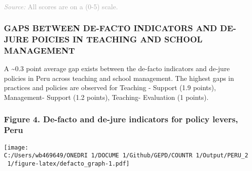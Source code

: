 \documentclass[twocolumn]{article}
\begin{document}
\begin{table}[H]
\\
{\scriptsize
    \textcolor{darkgray}{\textit{Source:} All scores are on a (0-5) scale.}
  }

\end{table}
\raggedbottom

\hypertarget{gaps-between-de-facto-indicators-and-de-jure-poicies-in-teaching-and-school-management}{%
\subsubsection{\texorpdfstring{\textbf{GAPS BETWEEN DE-FACTO INDICATORS
AND DE-JURE POICIES IN TEACHING AND SCHOOL
MANAGEMENT}}{GAPS BETWEEN DE-FACTO INDICATORS AND DE-JURE POICIES IN TEACHING AND SCHOOL MANAGEMENT}}\label{gaps-between-de-facto-indicators-and-de-jure-poicies-in-teaching-and-school-management}}

A \textasciitilde{}0.3 point average gap exists between the de-facto
indicators and de-jure policies in Peru across teaching and school
management. The highest gaps in practices and policies are observed for
Teaching - Support (1.9 points), Management- Support (1.2 points),
Teaching- Evaluation (1 points).

\hypertarget{figure-4.-de-facto-and-de-jure-indicators-for-policy-levers-peru}{%
\subsubsection{Figure 4. De-facto and de-jure indicators for policy
levers,
Peru}\label{figure-4.-de-facto-and-de-jure-indicators-for-policy-levers-peru}}

\texttt{[image: C:/Users/wb469649/ONEDRI~1/DOCUME~1/Github/GEPD/COUNTR~1/Output/PERU\_2~1/figure-latex/defacto\_graph-1.pdf]}
\end{document}
